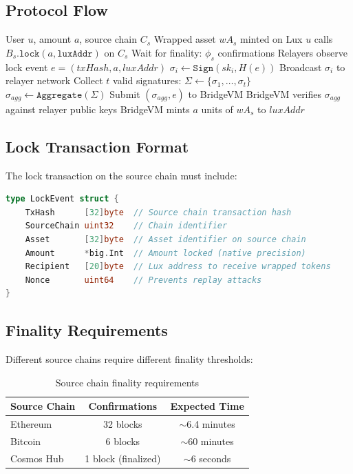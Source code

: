 \documentclass[11pt,a4paper]{article}
\theoremstyle{definition}
\begin{document}
\subsection{Protocol Flow}

\begin{algorithm}
\caption{Lock-and-Mint Protocol}
\begin{algorithmic}[1]
\Require User $u$, amount $a$, source chain $C_s$
\Ensure Wrapped asset $wA_s$ minted on Lux
\State $u$ calls $B_s.\texttt{lock}(a, \texttt{luxAddr})$ on $C_s$
\State Wait for finality: $\phi_s$ confirmations
\State Relayers observe lock event $e = (txHash, a, luxAddr)$
    \State $\sigma_i \gets \texttt{Sign}(sk_i, H(e))$
    \State Broadcast $\sigma_i$ to relayer network
\EndFor
\State Collect $t$ valid signatures: $\Sigma \gets \{\sigma_1, \ldots, \sigma_t\}$
\State $\sigma_{agg} \gets \texttt{Aggregate}(\Sigma)$
\State Submit $(\sigma_{agg}, e)$ to BridgeVM
\State BridgeVM verifies $\sigma_{agg}$ against relayer public keys
\State BridgeVM mints $a$ units of $wA_s$ to $luxAddr$
\end{algorithmic}
\end{algorithm}

\subsection{Lock Transaction Format}

The lock transaction on the source chain must include:

\begin{lstlisting}[language=Go]
type LockEvent struct {
    TxHash      [32]byte  // Source chain transaction hash
    SourceChain uint32    // Chain identifier
    Asset       [32]byte  // Asset identifier on source chain
    Amount      *big.Int  // Amount locked (native precision)
    Recipient   [20]byte  // Lux address to receive wrapped tokens
    Nonce       uint64    // Prevents replay attacks
}
\end{lstlisting}

\subsection{Finality Requirements}

Different source chains require different finality thresholds:

\begin{table}[h]
\centering
\begin{tabular}{@{}lcc@{}}
\toprule
Source Chain & Confirmations & Expected Time \\
\midrule
Ethereum & 32 blocks & $\sim$6.4 minutes \\
Bitcoin & 6 blocks & $\sim$60 minutes \\
Cosmos Hub & 1 block (finalized) & $\sim$6 seconds \\
\bottomrule
\end{tabular}
\caption{Source chain finality requirements}
\end{table}
\end{document}
